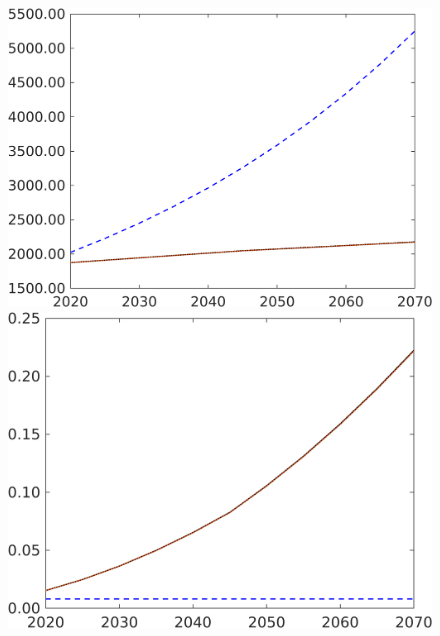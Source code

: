 \begin{figure}[h!!]
\begin{minipage}[]{0.32\textwidth}
	\end{minipage}
	\begin{minipage}[]{0.32\textwidth}
		\includegraphics[width=1\textwidth]{../../codding_model/own_basedOnFried/optimalPol_190722_tidiedUp/figures/all_10Aout22/CountMod1_target_Af_regime3_spillover0_sep1_extern0_PV1_etaa0.79_lgd0.png}
	\end{minipage}
	\begin{minipage}[]{0.32\textwidth}
		\includegraphics[width=1\textwidth]{../../codding_model/own_basedOnFried/optimalPol_190722_tidiedUp/figures/all_10Aout22/CountMod1_target_AgAf_regime3_spillover0_sep1_extern0_PV1_etaa0.79_lgd0.png}
	\end{minipage}
\end{figure}

